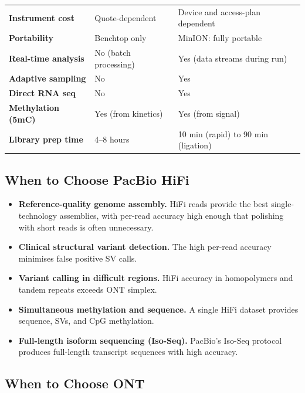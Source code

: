 \begin{table}[htbp]
\begin{tabularx}{\textwidth}{@{}>{\raggedright\bfseries}p{3.5cm} X X@{}}
Instrument cost & Quote-dependent & Device and access-plan dependent \\
Portability & Benchtop only & MinION: fully portable \\
Real-time analysis & No (batch processing) & Yes (data streams during run) \\
Adaptive sampling & No & Yes \\
Direct RNA seq & No & Yes \\
Methylation (5mC) & Yes (from kinetics) & Yes (from signal) \\
Library prep time & 4--8 hours & 10 min (rapid) to 90 min (ligation) \\
\bottomrule
\end{tabularx}
\end{table}

\subsection{When to Choose PacBio HiFi}

\begin{itemize}[nosep]
  \item \textbf{Reference-quality genome assembly.} HiFi reads provide the best single-technology assemblies, with per-read accuracy high enough that polishing with short reads is often unnecessary.
  \item \textbf{Clinical structural variant detection.} The high per-read accuracy minimises false positive SV calls.
  \item \textbf{Variant calling in difficult regions.} HiFi accuracy in homopolymers and tandem repeats exceeds ONT simplex.
  \item \textbf{Simultaneous methylation and sequence.} A single HiFi dataset provides sequence, SVs, and CpG methylation.
  \item \textbf{Full-length isoform sequencing (Iso-Seq).} PacBio's Iso-Seq protocol produces full-length transcript sequences with high accuracy.
\end{itemize}

\subsection{When to Choose ONT}

